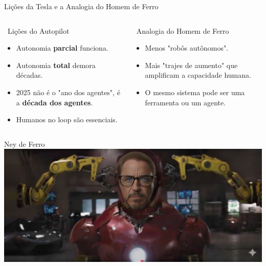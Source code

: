 \documentclass[aspectratio=169,12pt]{beamer}
\begin{document}
\begin{frame}{Lições da Tesla e a Analogia do Homem de Ferro}
    \begin{columns}
        \begin{column}{0.5\textwidth}
            \begin{block}{\faCar\, Lições do Autopilot}
                \begin{itemize}
                    \item Autonomia \textbf{parcial} funciona.
                    \item Autonomia \textbf{total} demora décadas.
                    \item 2025 não é o "ano dos agentes", é a \textbf{década dos agentes}.
                    \item Humanos no loop são essenciais.
                \end{itemize}
            \end{block}
        \end{column}
        \begin{column}{0.5\textwidth}
            \begin{exampleblock}{\faUserTie\, Analogia do Homem de Ferro}
                \begin{itemize}
                    \item Menos "robôs autônomos".
                    \item Mais "trajes de aumento" que amplificam a capacidade humana.
                    \item O mesmo sistema pode ser uma ferramenta ou um agente.
                \end{itemize}
            \end{exampleblock}
        \end{column}
    \end{columns}
\end{frame}
\begin{frame}{Ney de Ferro}
    \includegraphics[scale=0.3]{neydeFerro.png}
\end{frame}
\end{document}
